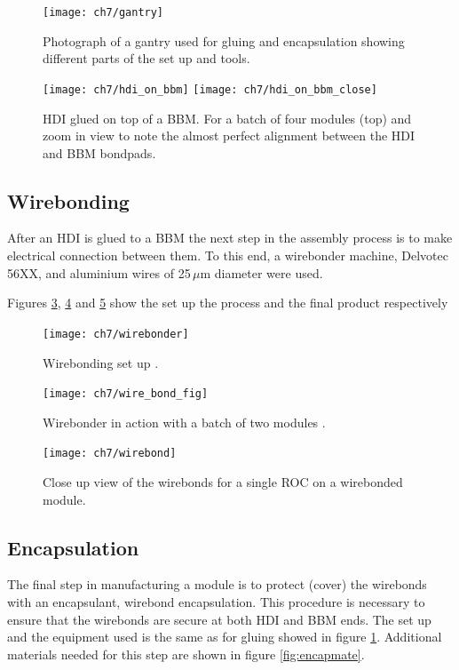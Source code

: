 \begin{figure}[!h]
	\centering
	\texttt{[image: ch7/gantry]}
	\caption[Gluing and encapsulation set up]{Photograph of a gantry used for gluing and encapsulation showing different parts of the set up and tools. }
	\label{fig:gantry}
\end{figure}

\begin{figure}[!h]
	\centering
	\texttt{[image: ch7/hdi\_on\_bbm]}
	\texttt{[image: ch7/hdi\_on\_bbm\_close]}
	\caption[Gluing result]{HDI glued on top of a BBM. For a batch of four modules (top) and zoom in view to note the almost perfect alignment between the HDI and BBM bondpads.}
	\label{fig:hdionbbm}
\end{figure}


\subsection{Wirebonding}
After an HDI is glued to a BBM the next step in the assembly process is to make electrical connection between them. To this end, a wirebonder machine, Delvotec 56XX, and aluminium wires of 25\,$\mu$m diameter were used. {}

Figures \ref{fig:wirebonder}, \ref{wirebondinaction} and \ref{fig:wirebond} show the set up the process and the final product respectively 
\begin{figure}[!h]
	\centering
  	\texttt{[image: ch7/wirebonder]}
  	\caption[wirebonder machine]{Wirebonding set up {}.}
  	\label{fig:wirebonder}
\end{figure}


\begin{figure}[!h]
	\centering
  	\texttt{[image: ch7/wire\_bond\_fig]}
  	\caption[wirebonder process]{Wirebonder in action with a batch of two modules \cite{brian_disc}.}
  	\label{wirebondinaction}
\end{figure}


\begin{figure}[!h]
  	\centering
  	\texttt{[image: ch7/wirebond]}
  	\caption[Wirebonded module]{Close up view of the wirebonds for a single ROC on a wirebonded module.}
  	\label{fig:wirebond}
\end{figure}



\subsection{Encapsulation}
The final step in manufacturing a module is to protect (cover) the wirebonds with an encapsulant, wirebond encapsulation. This procedure is necessary to ensure that the wirebonds are secure at both HDI and BBM ends. The set up and the equipment used is the same as for gluing showed in figure \ref{fig:gantry}. Additional materials needed for this step are shown in figure \ref{fig:encapmate}. 
 
